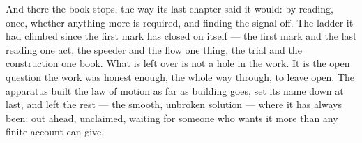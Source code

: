 And there the book stops, the way its last chapter said it would: by reading, once, whether anything more is required, and finding the signal off. The ladder it had climbed since the first mark has closed on itself --- the first mark and the last reading one act, the speeder and the flow one thing, the trial and the construction one book. What is left over is not a hole in the work. It is the open question the work was honest enough, the whole way through, to leave open. The apparatus built the law of motion as far as building goes, set its name down at last, and left the rest --- the smooth, unbroken solution --- where it has always been: out ahead, unclaimed, waiting for someone who wants it more than any finite account can give.
